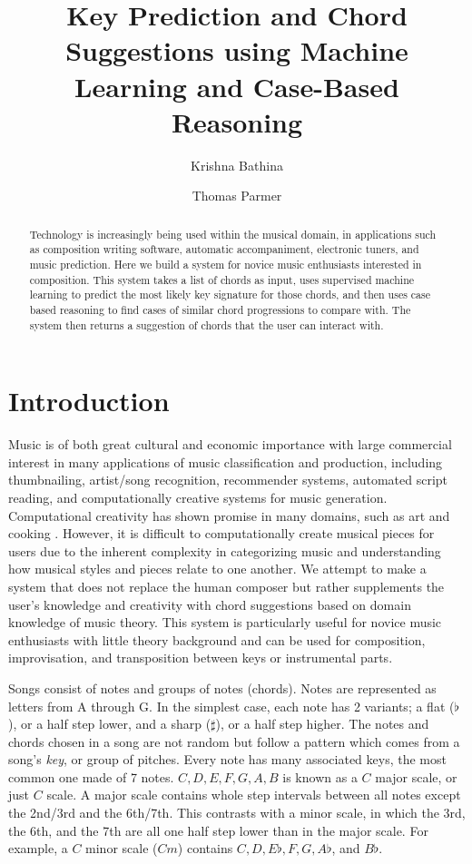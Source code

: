 \documentclass[letterpaper]{article}
\title{Key Prediction and Chord Suggestions using Machine Learning and Case-Based Reasoning}
\author{Krishna Bathina \and Thomas Parmer}
\begin{document}
\maketitle

\begin{abstract}
    Technology is increasingly being used within the musical domain, in applications such as composition writing software, automatic accompaniment, electronic tuners, and music prediction. Here we build a system for novice music enthusiasts interested in composition. This system takes a list of chords as input, uses supervised machine learning to predict the most likely key signature for those chords, and then uses case based reasoning to find cases of similar chord progressions to compare with. The system then returns a suggestion of chords that the user can interact with.
\end{abstract}

\section{Introduction}

Music is of both great cultural and economic importance with large commercial interest in many applications of music classification and production, including thumbnailing, artist/song recognition, recommender systems, automated script reading, and computationally creative systems for music generation.  Computational creativity has shown promise in many domains, such as art and cooking \cite{elgammal2015quantifying,varshney2013big,ahn2011flavor,teng2012recipe}.  However, it is difficult to computationally create musical pieces for users due to the inherent complexity in categorizing music and understanding how musical styles and pieces relate to one another.  We attempt to make a system that does not replace the human composer but rather supplements the user's knowledge and creativity with chord suggestions based on domain knowledge of music theory.  This system is particularly useful for novice music enthusiasts with little theory background and can be used for composition, improvisation, and transposition between keys or instrumental parts.

Songs consist of notes and groups of notes (chords). Notes are represented as letters from A through G. In the simplest case, each note has 2 variants; a flat ($\flat$), or a half step lower, and a sharp ($\sharp$), or a half step higher. The notes and chords chosen in a song are not random but follow a pattern which comes from a song's \textit{key}, or group of pitches. Every note has many associated keys, the most common one made of 7 notes. $C, D, E, F, G, A, B$ is known as a $C$ major scale, or just $C$ scale. A major scale contains whole step intervals between all notes except the 2nd/3rd and the 6th/7th. This contrasts with a minor scale, in which the 3rd, the 6th, and the 7th are all one half step lower than in the major scale. For example, a $C$ minor scale ($Cm$) contains $C, D, E\flat, F, G, A\flat$, and $B\flat$. 
\end{document}
